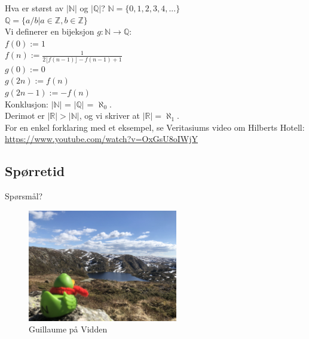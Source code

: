 \begin{frame}{Hva er størst av $|\mathbb{N}|$ og $|\mathbb{Q}|$?}
        $\mathbb{N} = \{0, 1, 2, 3, 4, ...\}$\\
        $\mathbb{Q} = \{a / b | a\in \mathbb{Z}, b \in \mathbb{Z}\}$\\[2mm]
        \pause
        Vi definerer en bijeksjon $g : \mathbb{N} \rightarrow \mathbb{Q}$:\\
        $f(0) := 1$\\
        $f(n) := \frac{1}{2\lfloor f(n-1) \rfloor - f(n-1)+1}$\\
        $g(0) := 0$\\
        $g(2n) := f(n)$\\
        $g(2n-1) := -f(n)$\\
        Konklusjon: $|\mathbb{N}|$ = $|\mathbb{Q}|$ = $\aleph_0$.\\[2mm]\pause
        Derimot er $|\mathbb{R}| > |\mathbb{N}|$, og vi skriver at $|\mathbb{R}| = \aleph_1$.\\ 
        For en enkel forklaring med et eksempel, se Veritasiums video om Hilberts Hotell: \url{https://www.youtube.com/watch?v=OxGsU8oIWjY}
\end{frame}

\subsection*{Spørretid}
\begin{frame}{Spørsmål?}
    \begin{figure}
        \centering
        \includegraphics[height = 4.9cm]{images/guillaume4.jpg}
        \caption{Guillaume på Vidden}
        \label{fig:guillaume4}
    \end{figure}
\end{frame}